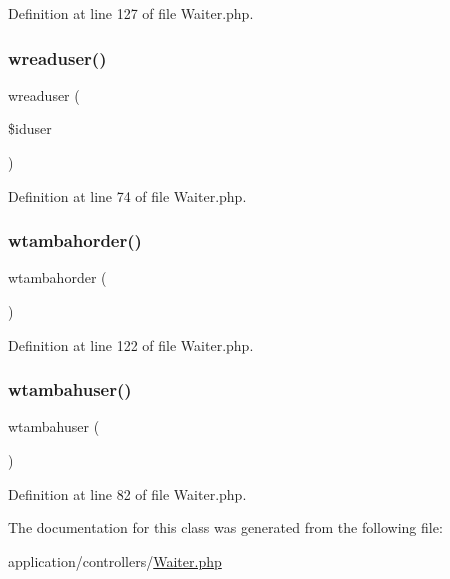 Definition at line 127 of file Waiter.\+php.

\mbox{\label{class_waiter_aa6f31a11f7d67fc778fb8405922357c3}} 
\subsubsection{\texorpdfstring{wreaduser()}{wreaduser()}}
{\footnotesize\ttfamily wreaduser (\begin{DoxyParamCaption}\item[{}]{\$iduser }\end{DoxyParamCaption})}



Definition at line 74 of file Waiter.\+php.

\mbox{\label{class_waiter_a26af24f9db480fe2cf3ba8d7033890e0}} 
\subsubsection{\texorpdfstring{wtambahorder()}{wtambahorder()}}
{\footnotesize\ttfamily wtambahorder (\begin{DoxyParamCaption}{ }\end{DoxyParamCaption})}



Definition at line 122 of file Waiter.\+php.

\mbox{\label{class_waiter_aba71b06fc60f6413543e3f0943288738}} 
\subsubsection{\texorpdfstring{wtambahuser()}{wtambahuser()}}
{\footnotesize\ttfamily wtambahuser (\begin{DoxyParamCaption}{ }\end{DoxyParamCaption})}



Definition at line 82 of file Waiter.\+php.



The documentation for this class was generated from the following file\+:\begin{DoxyCompactItemize}
\item 
application/controllers/\mbox{\hyperlink{_waiter_8php}{Waiter.\+php}}\end{DoxyCompactItemize}
